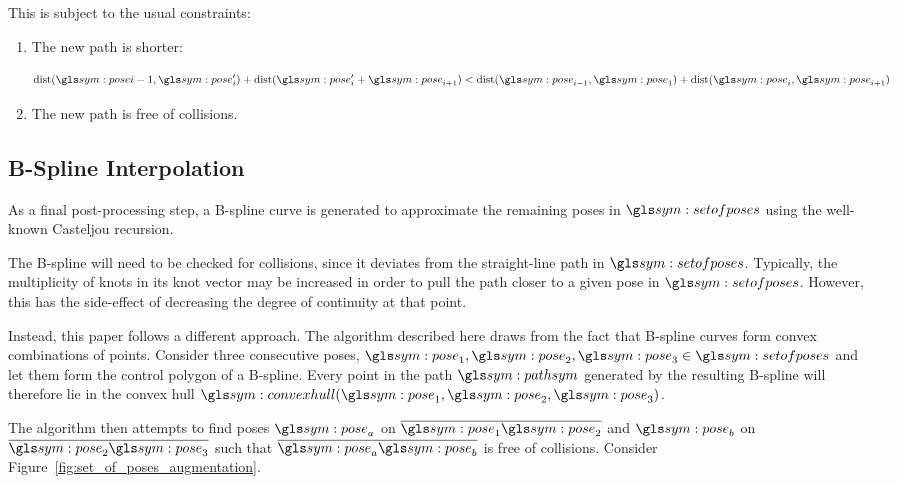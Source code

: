 		This is subject to the usual constraints:

		\begin{enumerate}

			\item

				The new path is shorter:

				\begin{equation}
					\dist(\pose{i - 1}, \pose_i') + \dist(\pose_i' +
					\pose_{i+1})
					<
					\dist(\pose_{i - 1}, \pose_{1}) + \dist(\pose_i, \pose_{i +
					1})
				\end{equation}

			\item

				The new path is free of collisions.

		\end{enumerate}

	\subsection{B-Spline Interpolation}


		As a final post-processing step, a B-spline curve is generated to
		approximate the remaining poses in $\setofposes$ using the well-known
		Casteljou recursion.

		The B-spline will need to be checked for collisions, since it deviates
		from the straight-line path in $\setofposes$. Typically, the
		multiplicity of knots in its knot vector may be increased in order to
		pull the path closer to a given pose in $\setofposes$. However, this has
		the side-effect of decreasing the degree of continuity at that
		point.

		Instead, this paper follows a different approach. The algorithm
		described here draws from the fact that B-spline curves form convex
		combinations of points. Consider three consecutive poses, $\pose_1,
		\pose_2, \pose_3 \in \setofposes$ and let them form the control polygon
		of a B-spline. Every point in the path $\pathsym$ generated by the
		resulting B-spline will therefore lie in the convex hull
		$\convexhull(\pose_1, \pose_2, \pose_3)$.

		The algorithm then attempts to find poses $\pose_a$ on
		$\vecline{\pose_1}{\pose_2}$ and $\pose_b$ on
		$\vecline{\pose_2}{\pose_3}$ such that $\vecline{\pose_a}{\pose_b}$ is
		free of collisions. Consider Figure~\ref{fig:set_of_poses_augmentation}.


